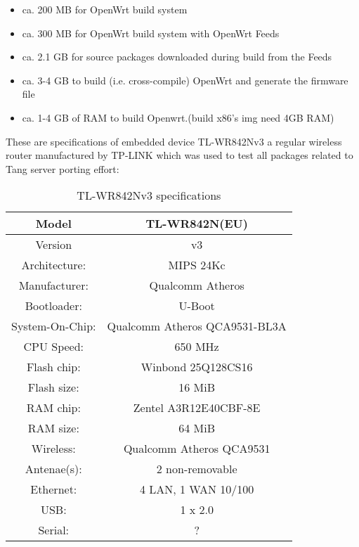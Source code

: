 \begin{itemize}
\item ca. 200 MB for OpenWrt build system
\item ca. 300 MB for OpenWrt build system with OpenWrt Feeds
\item ca. 2.1 GB for source packages downloaded during build from the Feeds
\item ca. 3-4 GB to build (i.e. cross-compile) OpenWrt and generate the firmware file
\item ca. 1-4 GB of RAM to build Openwrt.(build x86's img need 4GB RAM)
\end{itemize}

These are specifications of embedded device TL-WR842Nv3 a regular wireless router manufactured by TP-LINK which was used to test all packages related to Tang server porting effort:

\begin{table}[h]
\centering
\label{routerspec}
\begin{tabular}{c|c}
\hline
Model           &   TL-WR842N(EU)                   \\ \hline
Version         &   v3                              \\ \hline
Architecture:   &   MIPS 24Kc                       \\ \hline
Manufacturer:   &   Qualcomm Atheros                \\ \hline
Bootloader:     &   U-Boot                          \\ \hline
System-On-Chip: &   Qualcomm Atheros QCA9531-BL3A   \\ \hline
CPU Speed:      &   650 MHz                         \\ \hline
Flash chip:     &   Winbond 25Q128CS16              \\ \hline
Flash size:     &   16 MiB                          \\ \hline
RAM chip:       &   Zentel A3R12E40CBF-8E           \\ \hline
RAM size:       &   64 MiB                          \\ \hline
Wireless:       &   Qualcomm Atheros QCA9531        \\ \hline
Antenae(s):     &   2 non-removable                 \\ \hline
Ethernet:       &   4 LAN, 1 WAN 10/100             \\ \hline
USB:            &   1 x 2.0                         \\ \hline
Serial:         &   ?                               \\ \hline
\end{tabular}
\caption{TL-WR842Nv3 specifications}
\end{table}

